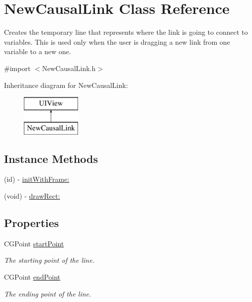 \hypertarget{interface_new_causal_link}{\section{New\-Causal\-Link Class Reference}
\label{interface_new_causal_link}
}


Creates the temporary line that represents where the link is going to connect to variables. This is used only when the user is dragging a new link from one variable to a new one.  




{\ttfamily \#import $<$New\-Causal\-Link.\-h$>$}

Inheritance diagram for New\-Causal\-Link\-:\begin{figure}[H]
\begin{center}
\leavevmode
\includegraphics[height=2.000000cm]{interface_new_causal_link}
\end{center}
\end{figure}
\subsection*{Instance Methods}
\begin{DoxyCompactItemize}
\item 
(id) -\/ \hyperlink{interface_new_causal_link_a100c2da2d92d7d9a4da9ad851dcc1114}{init\-With\-Frame\-:}
\item 
(void) -\/ \hyperlink{interface_new_causal_link_a8c03538769a6fcbd7aa8e672cf4b5c96}{draw\-Rect\-:}
\end{DoxyCompactItemize}
\subsection*{Properties}
\begin{DoxyCompactItemize}
\item 
\hypertarget{interface_new_causal_link_af5c8aa466e345adfab2e58ba5509edad}{C\-G\-Point \hyperlink{interface_new_causal_link_af5c8aa466e345adfab2e58ba5509edad}{start\-Point}}\label{interface_new_causal_link_af5c8aa466e345adfab2e58ba5509edad}

\begin{DoxyCompactList}\small\item\em The starting point of the line. \end{DoxyCompactList}\item 
\hypertarget{interface_new_causal_link_a8182eda9bbf2964ae5df72b56cabffb0}{C\-G\-Point \hyperlink{interface_new_causal_link_a8182eda9bbf2964ae5df72b56cabffb0}{end\-Point}}\label{interface_new_causal_link_a8182eda9bbf2964ae5df72b56cabffb0}

\begin{DoxyCompactList}\small\item\em The ending point of the line. \end{DoxyCompactList}\end{DoxyCompactItemize}


